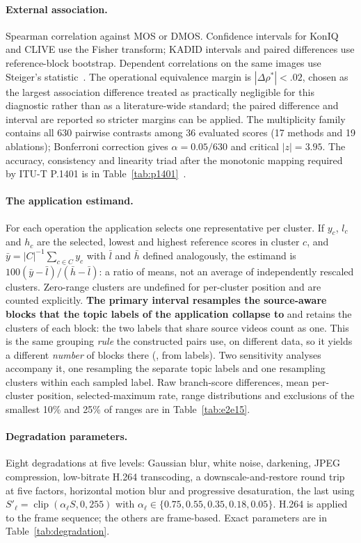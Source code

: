 \documentclass[sn-basic,Numbered]{sn-jnl}
\begin{document}
\paragraph{External association.} Spearman correlation against MOS or DMOS. Confidence
intervals for KonIQ and CLIVE use the Fisher transform; KADID intervals and paired
differences use reference-block bootstrap. Dependent correlations on the same images use
Steiger's statistic~\citep{steiger1980comparing}. The operational equivalence margin is
$|\Delta\rho^{*}|<.02$, chosen as the largest association difference treated as
practically negligible for this diagnostic rather than as a literature-wide standard; the
paired difference and interval are reported so stricter margins can be applied. The
multiplicity family contains all 630 pairwise contrasts among 36 evaluated scores
(17 methods and 19 ablations); Bonferroni correction gives $\alpha=0.05/630$ and critical
$|z|=3.95$. The accuracy, consistency and linearity triad after the monotonic mapping
required by ITU-T P.1401 is in Table~\ref{tab:p1401}~\citep{itu_p1401}.

\paragraph{The application estimand.} For each operation the application selects one
representative per cluster. If $y_c$, $l_c$ and $h_c$ are the selected, lowest and highest
reference scores in cluster $c$, and $\bar y=|C|^{-1}\sum_{c\in C}y_c$ with $\bar l$ and
$\bar h$ defined analogously, the estimand is $100(\bar y-\bar l)/(\bar h-\bar l)$: a
ratio of means, not an average of independently rescaled clusters. Zero-range clusters are
undefined for per-cluster position and are counted explicitly. \textbf{The primary interval resamples the \fusBlocos{} source-aware blocks that the \senBlocos{} topic labels of the application collapse to} and retains the clusters of each block: the two labels that share source videos count as one. This is the same grouping \emph{rule} the constructed pairs use, on different data, so it yields a different \emph{number} of blocks there (\invBlocos{}, from \invRotulos{} labels). Two sensitivity analyses accompany it, one resampling the \senBlocos{} separate topic labels and one resampling clusters within each sampled label. Raw branch-score differences,
mean per-cluster position, selected-maximum rate, range distributions and exclusions of
the smallest 10\% and 25\% of ranges are in Table~\ref{tab:e2e15}.

\paragraph{Degradation parameters.} Eight degradations at five levels: Gaussian blur,
white noise, darkening, JPEG compression, low-bitrate H.264 transcoding, a
downscale-and-restore round trip at five factors, horizontal motion blur and progressive
desaturation, the last using $S'_{\ell}=\operatorname{clip}(\alpha_{\ell}S,0,255)$ with
$\alpha_{\ell}\in\{0.75,0.55,0.35,0.18,0.05\}$. H.264 is applied to the frame sequence;
the others are frame-based. Exact parameters are in Table~\ref{tab:degradation}.
\end{document}
